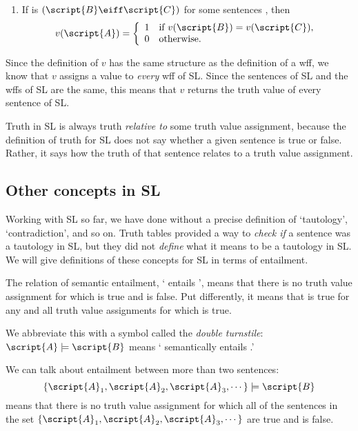 \begin{enumerate}

\item If  is $(\script{B}\eiff\script{C})$ for some sentences , then
\begin{displaymath}v(\script{A}) =
	\left\{\begin{array}{ll}
	1 & \mbox{if $v(\script{B}) = v(\script{C})$},\\
	0 & \mbox{otherwise.}
	\end{array}\right.
\end{displaymath}
\end{enumerate}

Since the definition of $v$ has the same structure as the definition of a wff, we know that $v$ assigns a value to \emph{every} wff of SL. Since the sentences of SL and the wffs of SL are the same, this means that $v$ returns the truth value of every sentence of SL.

Truth in SL is always truth \emph{relative to} some truth value assignment, because the definition of truth for SL does not say whether a given sentence is true or false. Rather, it says how the truth of that sentence relates to a truth value assignment.

\subsection{Other concepts in SL}

Working with SL so far, we have done without a precise definition of `tautology', `contradiction', and so on. Truth tables provided a way to \emph{check if} a sentence was a tautology in SL, but they did not \emph{define} what it means to be a tautology in SL. We will give definitions of these concepts for SL in terms of entailment.

The relation of semantic entailment, ` entails ', means that there is no truth value assignment for which  is true and  is false. Put differently, it means that  is true for any and all truth value assignments for which  is true.

We abbreviate this with a symbol called the \emph{double turnstile}:
$\script{A}\models\script{B}$ means ` semantically entails .'

We can talk about entailment between more than two sentences: $$\{\script{A}_1,\script{A}_2,\script{A}_3,\cdots\}\models\script{B}$$ means that there is no truth value assignment for which all of the sentences in the set $\{\script{A}_1,\script{A}_2,\script{A}_3,\cdots\}$ are true and  is false.

